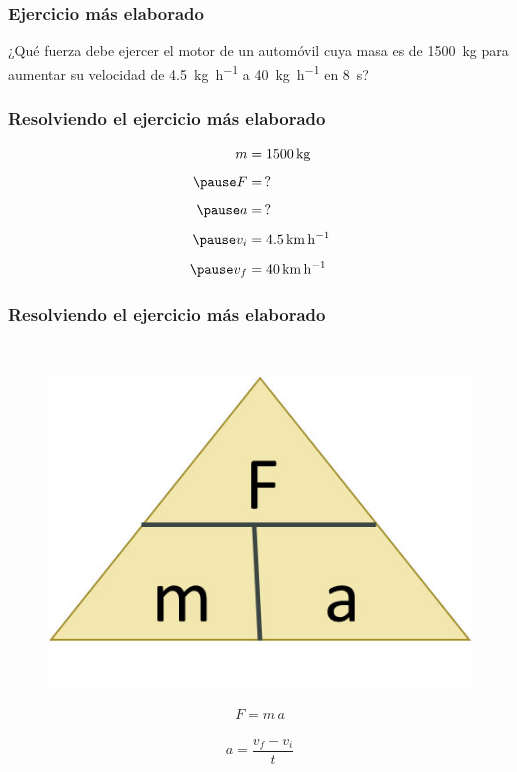 \documentclass[14pt]{beamer}
\begin{document}
\begin{frame}
\frametitle{Ejercicio más elaborado}
¿Qué fuerza debe ejercer el motor de un automóvil cuya masa es de \SI{1500}{\kilo\gram} para aumentar su velocidad de \SI{4.5}{\kilo\gram\per\hour} a \SI{40}{\kilo\gram\per\hour} en \SI{8}{\second}?
\end{frame}
\begin{frame}
\frametitle{Resolviendo el ejercicio más elaborado}
\pause
\begin{eqnarray*}
\begin{aligned}
m &= \SI{1500}{\kilo\gram} \\[0.5em] \pause
F &= \, ? \\[0.5em] \pause
a &= \, ? \\[0.5em] \pause
v_{i} &= \SI{4.5}{\kilo\meter\per\hour} \\[0.5em] \pause
v_{f} &= \SI{40}{\kilo\meter\per\hour}
\end{aligned}
\end{eqnarray*}
\end{frame}
\begin{frame}
\frametitle{Resolviendo el ejercicio más elaborado}
\\
\begin{minipage}{0.4\linewidth}
\begin{figure}
    \centering
    \includegraphics[scale=0.75]{Imagenes/Newton_11.jpg}
\end{figure}
\end{minipage}
\begin{minipage}{0.4\linewidth}
\begin{align*}
F = m \, a
\end{align*}
\end{minipage}
\pause
\begin{align*}
a = \dfrac{v_{f} - v_{i}}{t}
\end{align*}
\end{frame}
\end{document}
